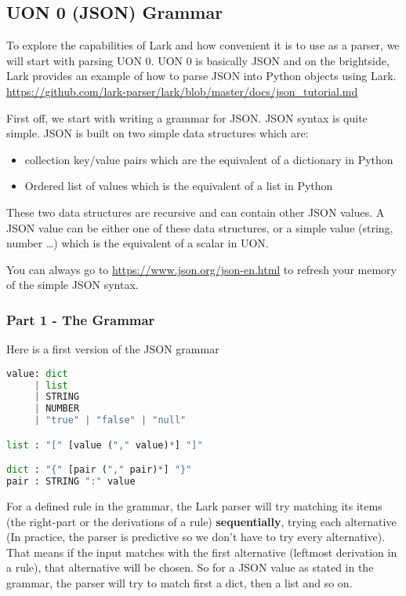 \documentclass[12pt]{article}
\begin{document}
\subsection{UON 0 (JSON) Grammar}
To explore the capabilities of Lark and how convenient it is to use as a parser, we will start with parsing UON 0. UON 0 is basically JSON and on the brightside, Lark provides an example of how to parse JSON into Python objects using Lark. \url{https://github.com/lark-parser/lark/blob/master/docs/json_tutorial.md}

First off, we start with writing a grammar for JSON. JSON syntax is quite simple. JSON is built on two simple data structures which are:
\begin{itemize}
    \item collection key/value pairs which are the equivalent of a dictionary in Python
    \item Ordered list of values which is the equivalent of a list in Python
\end{itemize}
These two data structures are recursive and can contain other JSON values.
A JSON value can be either one of these data structures, or a simple value (string, number …) which is the equivalent of a scalar in UON.

You can always go to \url{https://www.json.org/json-en.html} to refresh your memory of the simple JSON syntax.

\subsubsection{Part 1 - The Grammar}
Here is a first version of the JSON grammar

\begin{lstlisting}[language=Python]
value: dict
     | list
     | STRING
     | NUMBER
     | "true" | "false" | "null"

list : "[" [value ("," value)*] "]"

dict : "{" [pair ("," pair)*] "}"
pair : STRING ":" value
\end{lstlisting}

For a defined rule in the grammar, the Lark parser will try matching its items (the right-part or the derivations of a rule) \textbf{sequentially}, trying each alternative (In practice, the parser is predictive so we don't have to try every alternative). That means if the input matches with the first alternative (leftmost derivation in a rule), that alternative will be chosen. So for a JSON value as stated in the grammar, the parser will try to match first a dict, then a list and so on.
\end{document}
